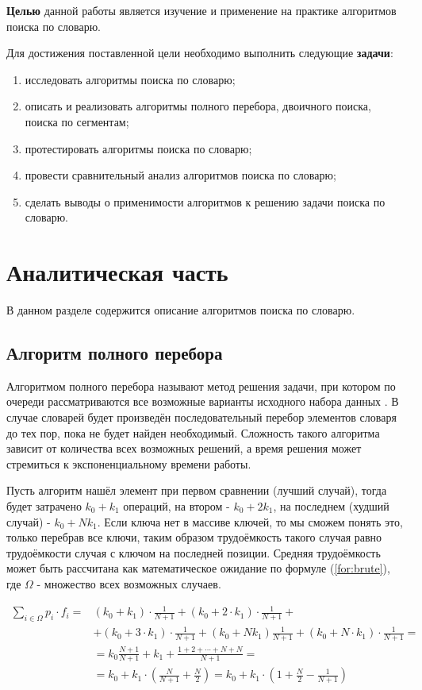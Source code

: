 \documentclass[12pt]{report}
\begin{document}
\textbf{Целью} данной работы является изучение и применение на практике алгоритмов поиска по словарю.

Для достижения поставленной цели необходимо выполнить следующие \textbf{задачи}:
\begin{enumerate}
    \item исследовать алгоритмы поиска по словарю;
	\item описать и реализовать алгоритмы полного перебора, двоичного поиска, поиска по сегментам;
	\item протестировать алгоритмы поиска по словарю;
	\item провести сравнительный анализ алгоритмов поиска по словарю;
	\item сделать выводы о применимости алгоритмов к решению задачи поиска по словарю.
\end{enumerate}

\chapter{Аналитическая часть}
В данном разделе содержится описание алгоритмов поиска по словарю.

\section{Алгоритм полного перебора}
Алгоритмом полного перебора называют метод решения задачи, при котором по очереди рассматриваются все возможные варианты исходного набора данных \cite{brute}. В случае словарей будет произведён последовательный перебор элементов словаря до тех пор, пока не будет найден необходимый.
Сложность такого алгоритма зависит от количества всех возможных решений, а время решения может стремиться к экспоненциальному времени работы.

Пусть алгоритм нашёл элемент при первом сравнении (лучший случай), тогда будет затрачено $k_0 + k_1$ операций, на втором - $k_0 + 2k_1$, на последнем (худший случай) - $k_0 + Nk_1$. Если ключа нет в массиве ключей, то мы сможем понять это, только перебрав все ключи, таким образом трудоёмкость такого случая равно трудоёмкости случая с ключом на последней позиции. Средняя трудоёмкость может быть рассчитана как математическое ожидание по формуле (\ref{for:brute}), где $\Omega$ - множество всех возможных случаев.

\begin{equation}
	\label{for:brute}
	\begin{aligned}
		\sum\limits_{i \in \Omega} p_i \cdot f_i = & (k_0 + k_1) \cdot \frac{1}{N + 1} + (k_0 + 2 \cdot k_1) \cdot \frac{1}{N+1} +\\
		& + (k_0 + 3 \cdot k_1) \cdot \frac{1}{N + 1} + (k_0 + Nk_1)\frac{1}{N + 1} + (k_0 + N \cdot k_1) \cdot \frac{1}{N + 1} =\\
		& = k_0\frac{N+1}{N+1}+k_1+\frac{1 + 2 + \cdots + N + N}{N + 1} = \\
		& = k_0 + k_1 \cdot \left(\frac{N}{N + 1} + \frac{N}{2}\right) = k_0 + k_1 \cdot \left(1 + \frac{N}{2} - \frac{1}{N + 1}\right)
	\end{aligned}
\end{equation}
\end{document}
